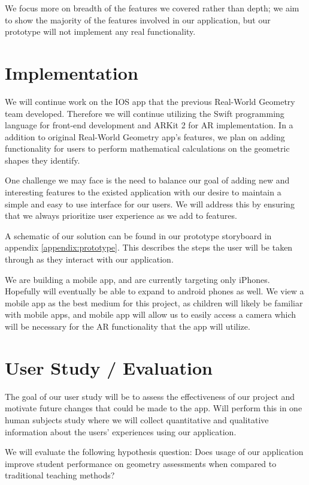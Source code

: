 \documentclass[acmsmall, nonacm]{acmart}
\begin{document}
We focus more on breadth of the features we covered rather than depth; we aim to
show the majority of the features involved in our application, but our prototype
will not implement any real functionality.


\section{Implementation}

We will continue work on the IOS app that the previous Real-World Geometry team
developed. Therefore we will continue utilizing the Swift programming language
for front-end development and ARKit 2 for AR implementation. In a addition to
original Real-World Geometry app's features, we plan on adding functionality for
users to perform mathematical calculations on the geometric shapes they
identify.

One challenge we may face is the need to balance our goal of adding new and
interesting features to the existed application with our desire to maintain a
simple and easy to use interface for our users. We will address this by ensuring
that we always prioritize user experience as we add to features.

A schematic of our solution can be found in our prototype storyboard in appendix
\ref{appendix:prototype}. This describes the steps the user will be taken
through as they interact with our application.

We are building a mobile app, and are currently targeting only
iPhones. Hopefully will eventually be able to expand to android phones as
well. We view a mobile app as the best medium for this project, as children will
likely be familiar with mobile apps, and mobile app will allow us to easily
access a camera which will be necessary for the AR functionality that the app
will utilize.

\section{User Study / Evaluation}

The goal of our user study will be to assess the effectiveness of our project
and motivate future changes that could be made to the app. Will perform this in
one human subjects study where we will collect quantitative and qualitative
information about the users' experiences using our application.

We will evaluate the following hypothesis question: Does usage of our
application improve student performance on geometry assessments when compared to
traditional teaching methods?
\end{document}
